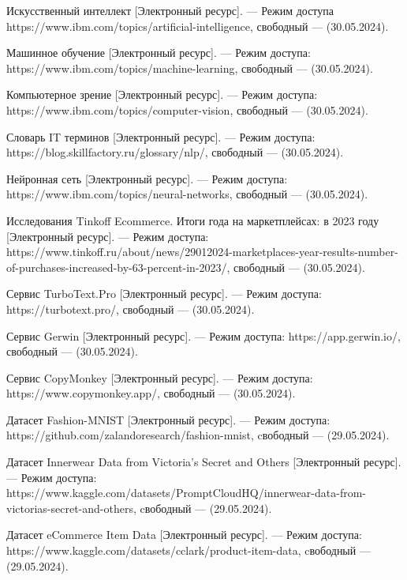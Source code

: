 \newpage 
\printbibliography[heading=bibintoc] 

\begin{thebibliography}{0}
	Искусственный интеллект [Электронный ресурс]. — Режим доступа https://www.ibm.com/topics/artificial-intelligence, свободный — (30.05.2024).
	
	Машинное обучение [Электронный ресурс]. — Режим доступа: https://www.ibm.com/topics/machine-learning, свободный — (30.05.2024).
	
	Компьютерное зрение [Электронный ресурс]. — Режим доступа: https://www.ibm.com/topics/computer-vision, свободный — (30.05.2024). 
	
	Словарь IT терминов [Электронный ресурс]. — Режим доступа: https://blog.skillfactory.ru/glossary/nlp/, свободный — (30.05.2024). 
	
	Нейронная сеть [Электронный ресурс]. — Режим доступа: https://www.ibm.com/topics/neural-networks, свободный — (30.05.2024). 
	
	Исследования Tinkoff Ecommerce. Итоги года на маркетплейсах: в 2023 году [Электронный ресурс]. — Режим доступа: https://www.tinkoff.ru/about/news/29012024-marketplaces-year-results-number-of-purchases-increased-by-63-percent-in-2023/, свободный — (30.05.2024).
	
	Сервис TurboText.Pro [Электронный ресурс]. — Режим доступа: https://turbotext.pro/, свободный — (30.05.2024).
	
	Сервис Gerwin [Электронный ресурс]. — Режим доступа: https://app.gerwin.io/, свободный — (30.05.2024).
	
	Сервис CopyMonkey [Электронный ресурс]. — Режим доступа: https://www.copymonkey.app/, свободный — (30.05.2024).
	
	Датасет Fashion-MNIST [Электронный ресурс]. — Режим доступа: https://github.com/zalandoresearch/fashion-mnist, cвободный — (29.05.2024).
	
	Датасет Innerwear Data from Victoria's Secret and Others [Электронный ресурс]. — Режим доступа: https://www.kaggle.com/datasets/PromptCloudHQ/innerwear-data-from-victorias-secret-and-others, cвободный — (29.05.2024).
	
	Датасет eCommerce Item Data [Электронный ресурс]. — Режим доступа: https://www.kaggle.com/datasets/cclark/product-item-data, cвободный — (29.05.2024).
	

\end{thebibliography}
